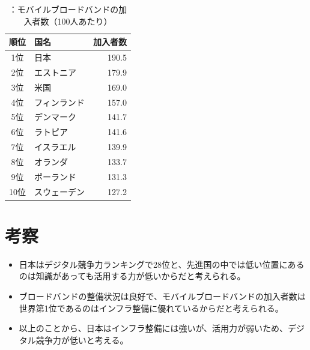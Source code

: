 \documentclass[a4paper,11pt,dvipdfmx]{ujarticle}
\begin{document}
\begin{table}[htbp]
    \centering
    \caption{：モバイルブロードバンドの加入者数（100人あたり）}
    \label{tbl:加入者数}
    
    \begin{tabular}{|c|l|r|}\hline
        順位 & 国名 & 加入者数 \\
        \hline
        1位 & 日本 & 190.5 \\
        \hline
        2位 & エストニア & 179.9 \\
        \hline
        3位 & 米国 & 169.0 \\
        \hline
        4位 & フィンランド & 157.0 \\
        \hline
        5位 & デンマーク & 141.7 \\
        \hline
        6位 & ラトピア & 141.6 \\
        \hline 
        7位 & イスラエル & 139.9 \\
        \hline
        8位 & オランダ & 133.7 \\
        \hline
        9位 & ポーランド & 131.3 \\
        \hline
        10位 & スウェーデン & 127.2 \\
        \hline
    \end{tabular}
\end{table}

\maketitle
 \section{考察}

\begin{itemize}
    \item 日本はデジタル競争力ランキングで28位と、先進国の中では低い位置にあるのは知識があっても活用する力が低いからだと考えられる。
    \item ブロードバンドの整備状況は良好で、モバイルブロードバンドの加入者数は世界第1位であるのはインフラ整備に優れているからだと考えられる。
    \item 以上のことから、日本はインフラ整備には強いが、活用力が弱いため、デジタル競争力が低いと考える。
\end{itemize}
 


\end{document}
